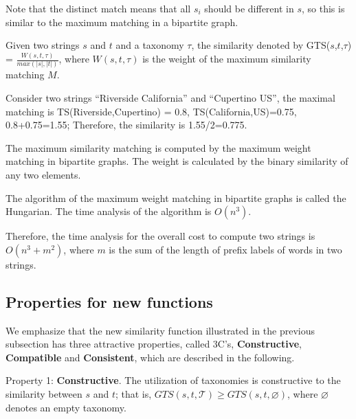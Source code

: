 \smallskip

Note that the distinct match means that all $s_i$ should be different in $s$, so this is similar to the maximum matching in a bipartite graph.

\smallskip


\begin{definition}  Given two strings $s$ and $t$ and a taxonomy $\tau$, the similarity denoted by GTS($s$,$t$,$\tau$) =   $\frac{W(s,t,\tau)}{max(|s|,|t|)}$, where $W(s,t,\tau)$ is the weight of the maximum similarity matching $M$.  \label{def:efs}
\end{definition}

\smallskip

\begin{example} Consider two strings ``\textsf{Riverside California}'' and ``\textsf{Cupertino US}'', the maximal matching is  TS(Riverside,Cupertino) = 0.8, TS(California,US)=0.75,  0.8+0.75=1.55; Therefore, the similarity is 1.55/2=0.775. \label{exp:TS}
\end{example}


The maximum  similarity  matching is computed by the maximum weight matching in bipartite graphs. The weight is calculated by the binary similarity of any two elements.

The algorithm of the maximum weight matching in bipartite graphs is called the Hungarian\cite{journals/JSIAM/Munkres57}. The time analysis of the algorithm is $O(n^3)$.


Therefore, the  time analysis for the overall cost to compute two strings is $O(n^3+m^2)$, where $m$ is the sum of the length of prefix labels of words in two strings.

\subsection{Properties for new functions}

We emphasize that the new similarity function illustrated in the previous subsection has three attractive properties, called 3C's, \textbf{Constructive}, \textbf{Compatible} and \textbf{Consistent}, which are described in the following.
 

\smallskip

Property 1: \textbf{Constructive}.  The utilization of taxonomies is constructive to the similarity between $s$ and $t$; that is, $GTS(s,t,\mathcal{T} ) \geq  GTS(s,t, \varnothing)$, where $\varnothing$ denotes an empty taxonomy.

